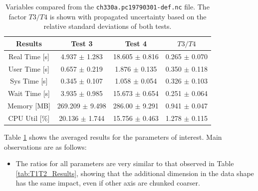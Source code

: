\documentclass{article}
\begin{document}
\begin{table}[h!]
    \centering
    \begin{tabular}{cccc}
        \hline
        \textbf{Results} & Test 3               & Test 4               & $T3/T4$ \\ \hline
        Real Time [s]    & 4.937 $\pm$ 1.283    & 18.605 $\pm$ 0.816   & 0.265 $\pm$ 0.070 \\
        User Time [s]    & 0.657 $\pm$ 0.219    & 1.876 $\pm$ 0.135    & 0.350 $\pm$ 0.118 \\
        Sys Time [s]     & 0.345 $\pm$ 0.107    & 1.058 $\pm$ 0.054    & 0.326 $\pm$ 0.103 \\
        Wait Time [s]    & 3.935 $\pm$ 0.985    & 15.673 $\pm$ 0.654   & 0.251 $\pm$ 0.064 \\
        Memory [MB]      & 269.209 $\pm$ 9.498  & 286.00 $\pm$ 9.291   & 0.941 $\pm$ 0.047 \\
        CPU Util [\%]    & 20.136 $\pm$ 1.744   & 15.756 $\pm$ 0.463  & 1.278 $\pm$ 0.115 \\
        \hline
    \end{tabular}
    \caption{Variables compared from the \texttt{ch330a.pc19790301-def.nc} file. The factor $T3/T4$ is shown with propagated uncertainty based on the relative standard deviations of both tests.}
    \label{tab:T3T4_Results}
\end{table}

\break
\noindent Table \ref{tab:T3T4_Results} shows the averaged results for the parameters of interest. Main observations are as follows:
\begin{itemize}
    \item The ratios for all parameters are very similar to that observed in Table \ref{tab:T1T2_Results}, showing that the additional dimension in the data shape has the same impact, even if other axis are chunked coarser. 
\end{itemize}
\end{document}

